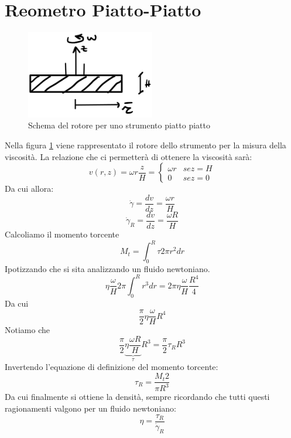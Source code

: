 \section{Reometro Piatto-Piatto}
\begin{figure}
\centering
\includegraphics[width = 0.5\textwidth]{gfx/PiattoPiatto}
\caption{Schema del rotore per uno strumento piatto piatto}
\label{fig:PiattoPiatto}
\end{figure}

Nella figura \ref{fig:PiattoPiatto} viene rappresentato il rotore dello strumento per la misura della viscosità.
La relazione che ci permetterà di ottenere la viscosità sarà:
\begin{equation}
v(r,z) = \omega r \frac{z}{H} =%
\begin{cases}
\omega r & se z = H\\
0 & se z = 0
\end{cases}
\end{equation}
Da cui allora:
\begin{equation}
\dot{\gamma} = \frac{dv}{dz} = \frac{\omega r}{H}
\end{equation}
\begin{equation}
\dot{\gamma}_R = \frac{dv}{dz} = \frac{\omega R}{H}
\end{equation}
Calcoliamo il momento torcente
\begin{equation}
M_t = \int_0^R{\tau 2\pi r^2 dr}
\end{equation}
Ipotizzando che si sita analizzando un fluido newtoniano.
\begin{equation}
\eta \frac{\omega}{H} 2\pi \int_0^R{r^3 dr} =%
2\pi \eta \frac{\omega}{H} \frac{R^4}{4}
\end{equation}
Da cui
\begin{equation}
\frac{\pi}{2} \eta \frac{\omega}{H} R^4
\end{equation}
Notiamo che
\begin{equation}
\frac{\pi}{2} \underbrace{\eta \frac{\omega R}{H}}_{\tau} R^3 = \frac{\pi}{2} \tau_R R^3
\end{equation}
Invertendo l'equazione di definizione del momento torcente:
\begin{equation}
\tau_R = \frac{M_t 2}{\pi R^3}
\end{equation}
Da cui finalmente si ottiene la densità, sempre ricordando che tutti questi ragionamenti valgono per un fluido newtoniano:
\begin{equation}
\eta = \frac{\tau_R}{\dot{\gamma}_R}
\end{equation}


